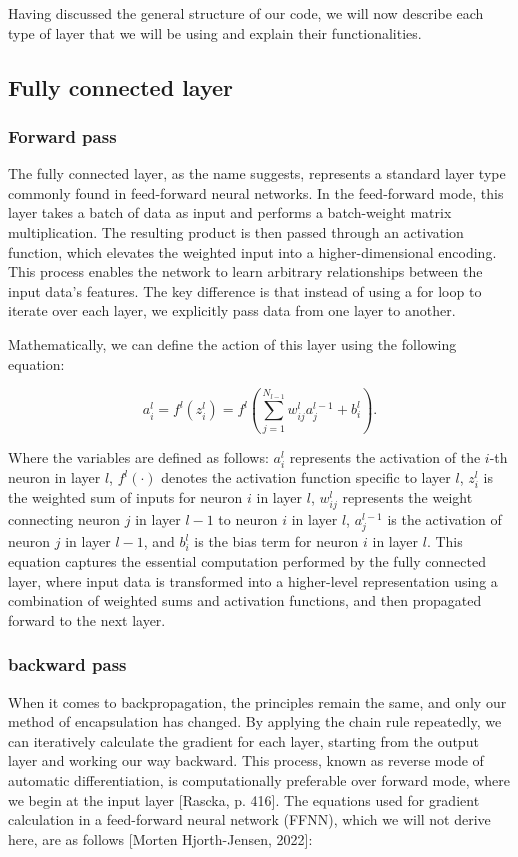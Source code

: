 \documentclass[onecolumn,10pt,cleanfoot]{asme2ej}
\begin{document}
Having discussed the general structure of our code, we will now describe each type of layer that we will be using and explain their functionalities.

\subsection{Fully connected layer}
\subsubsection{Forward pass}
The fully connected layer, as the name suggests, represents a standard layer type commonly found in feed-forward neural networks. In the feed-forward mode, this layer takes a batch of data as input and performs a batch-weight matrix multiplication. The resulting product is then passed through an activation function, which elevates the weighted input into a higher-dimensional encoding. This process enables the network to learn arbitrary relationships between the input data's features. The key difference is that instead of using a for loop to iterate over each layer, we explicitly pass data from one layer to another.

Mathematically, we can define the action of this layer using the following equation:

\begin{equation}
a_i^l = f^l(z_i^l) = f^l\left(\sum_{j=1}^{N_{l-1}} w_{ij}^l a_j^{l-1} + b_i^l\right).
\end{equation}

Where the variables are defined as follows: $a_i^l$ represents the activation of the $i$-th neuron in layer $l$, $f^l(\cdot)$ denotes the activation function specific to layer $l$, $z_i^l$ is the weighted sum of inputs for neuron $i$ in layer $l$, $w_{ij}^l$ represents the weight connecting neuron $j$ in layer $l-1$ to neuron $i$ in layer $l$, $a_j^{l-1}$ is the activation of neuron $j$ in layer $l-1$, and $b_i^l$ is the bias term for neuron $i$ in layer $l$. This equation captures the essential computation performed by the fully connected layer, where input data is transformed into a higher-level representation using a combination of weighted sums and activation functions, and then propagated forward to the next layer.

\subsubsection{backward pass}
When it comes to backpropagation, the principles remain the same, and only our method of encapsulation has changed. By applying the chain rule repeatedly, we can iteratively calculate the gradient for each layer, starting from the output layer and working our way backward. This process, known as reverse mode of automatic differentiation, is computationally preferable over forward mode, where we begin at the input layer [Rascka, p. 416]. The equations used for gradient calculation in a feed-forward neural network (FFNN), which we will not derive here, are as follows [Morten Hjorth-Jensen, 2022]:
\end{document}
